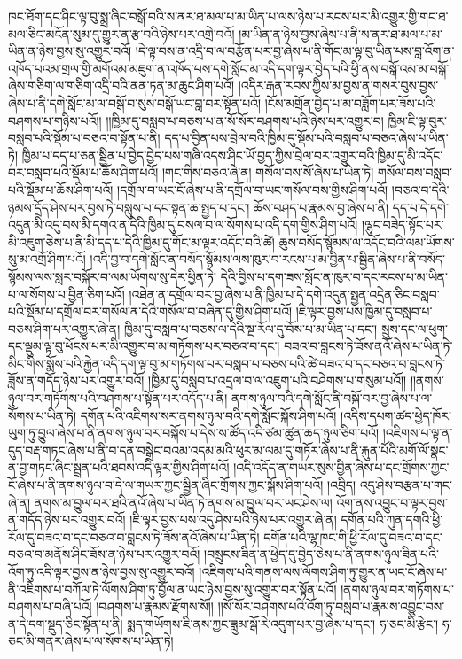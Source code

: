 ཁང་ཐོག་དང་ཤིང་ལྟ་བུ་སྨྲ་ཞིང་བསྒོ་བའི་ས་ནར་ཐ་མལ་པ་མ་ཡིན་པ་ལས་ཉེས་པ་རངས་པར་མི་འགྱུར་གྱི་གང་ཐ་མལ་ཅིང་མངོན་སུམ་དུ་གྱུར་ན་རྩ་བའི་ཉེས་པར་འགྲེ་བའོ། །མ་ཡིན་ན་ཉེས་བྱས་ཞེས་པ་ནི་ས་ནར་ཐ་མལ་པ་མ་ཡིན་ན་ཉེས་བྱས་སུ་འགྱུར་བའོ། །དེ་ལྟ་བས་ན་འདྲི་བ་ལ་བརྩོན་པར་བྱ་ཞེས་པ་ནི་གོང་མ་ལྟ་བུ་ཡིན་པས་བླ་འོག་ན་འཁོད་པའམ་གྲལ་གྱི་མགོའམ་མཇུག་ན་འཁོད་པས་དགེ་སློང་མ་འདི་དག་ལྟར་བྱེད་པའི་ཕྱི་ནས་བསྒོ་འམ་མ་བསྒོ་ཞེས་གཅིག་ལ་གཅིག་འདྲི་བའི་ནན་ཏན་མ་ཆུང་ཤིག་པའོ། །འདིར་རྒན་རབས་ཀྱིས་མ་བྱས་ན་གསར་བུས་བྱས་ཞེས་པ་ནི་དགེ་སློང་མ་ལ་བསྒོ་བ་སུས་བསྒོ་ཡང་བླ་བར་སྟོན་པའོ། །ངོས་མགྲོན་བྱེད་པ་མ་བཟློག་པར་ཟོས་པའི་བཤགས་པ་གཉིས་པའོ།། །།ཁྱིམ་དུ་བསླབ་པ་བཅས་པ་ན་སོ་སོར་བཤགས་པའི་ཉེས་པར་འགྱུར་བ། ཁྱིམ་ཇི་ལྟ་བུར་བསླབ་པའི་སྡོམ་པ་བཅའ་བ་སྟོན་པ་ནི། དད་པ་བྱིན་པས་བྲེལ་བའི་ཁྱིམ་དུ་སྡོམ་པའི་བསླབ་པ་བཅའ་ཞེས་པ་ཡིན་ཏེ། ཁྱིམ་པ་དད་པ་ཅན་སྦྱིན་པ་བྱེད་བྱེད་པས་གཞི་འདས་ཤིང་ཡོ་བྱད་ཀྱིས་བྲེལ་བར་འགྱུར་བའི་ཁྱིམ་དུ་མི་འདོང་བར་བསླབ་པའི་སྡོམ་པ་ཆོས་ཤིག་པའོ། །གང་གིས་བཅའ་ཞེ་ན། གསོལ་བས་སོ་ཞེས་པ་ཡིན་ཏེ། གསོལ་བས་བསླབ་པའི་སྡོམ་པ་ཆོས་ཤིག་པའོ། །དགྲོལ་བ་ཡང་ངོ་ཞེས་པ་ནི་དགྲོལ་བ་ཡང་གསོལ་བས་གྱིས་ཤིག་པའོ། །བཅའ་བ་དེའི་ཉམས་དྲོད་ཤེས་པར་བྱས་ཏེ་བསླུས་པ་དང་སྟན་ཆ་སྤྱད་པ་དང་། ཆོས་བཤད་པ་རྣམས་བྱ་ཞེས་པ་ནི། དད་པ་དེ་དགེ་འདུན་མི་འདུ་བས་མི་དགའ་ན་དེའི་ཁྱིམ་དུ་བསལ་བ་ལ་སོགས་པ་འདི་དག་གྱིས་ཤིག་པའོ། །ལྷུང་བཟེད་སྟོང་པར་མི་འཇུག་ཅེས་པ་ནི་མི་དད་པ་དེའི་ཁྱིམ་དུ་གོང་མ་ལྟར་འདོང་བའི་ཚེ། ཆུས་བསོད་སྙོམས་ལ་འདོང་བའི་ལམ་ཡོགས་སུ་མ་འགྲོ་ཤིག་པའོ། །འདི་བྱ་བ་དགེ་སློང་ན་བསོད་སྙོམས་ལས་ཁུར་བ་རངས་པ་མ་བྱིན་པ་སྦྱིན་ཞེས་པ་ནི་བསོད་སྙོམས་ལས་སླར་བསྐོར་བ་ལམ་ཡོགས་སུ་དེར་ཕྱིན་ཏེ། དེའི་བྱིས་པ་དག་ཟས་སློང་ན་ཁུར་བ་དང་རངས་པ་མ་ཡིན་པ་ལ་སོགས་པ་བྱིན་ཅིག་པའོ། །འཐེན་ན་དགྲོལ་བར་བྱ་ཞེས་པ་ནི་ཁྱིམ་པ་དེ་དགེ་འདུན་སྤྱན་འདྲེན་ཅིང་བསླབ་པའི་སྡོམ་པ་དགྲོལ་བར་གསོལ་ན་དེའི་གསོལ་བ་བཞིན་དུ་གྱིས་ཤིག་པའོ། །ཇི་ལྟར་བྱས་པས་ཁྱིམ་དུ་བསླབ་པ་བཅས་ཤིག་པར་འགྱུར་ཞེ་ན། ཁྱིམ་དུ་བསླབ་པ་བཅས་ལ་དེའི་སྔ་རོལ་དུ་བོས་པ་མ་ཡིན་པ་དང་། སྲུས་དང་ལ་ཕུག་དང་ལྡུམ་ལྟ་བུ་ཕོངས་པར་མི་འགྱུར་བ་མ་གཏོགས་པར་བཅའ་བ་དང་། བཟའ་བ་བླངས་ཏེ་ཟོས་ནའོ་ཞེས་པ་ཡིན་ཏེ་མིང་གིས་སྨོས་པའི་རྐྱེན་འདི་དག་ལྟ་བུ་མ་གཏོགས་པར་བསླབ་པ་བཅས་པའི་ཚེ་བཟའ་བ་དང་བཅའ་བ་བླངས་ཏེ་ཟློས་ན་གདོད་ཉེས་པར་འགྱུར་བའོ། །ཁྱིམ་དུ་བསླབ་པ་འདྲལ་བ་ལ་འཇུག་པའི་བཤེགས་པ་གསུམ་པའོ།། །།ནགས་ཉུལ་བར་གཏོགས་པའི་བཤགས་པ་སྟོན་པར་འདོད་པ་ནི། ནགས་ཉུལ་བའི་དགེ་སློང་ནི་བསྐོ་བར་བྱ་ཞེས་པ་ལ་སོགས་པ་ཡིན་ཏེ། དགོན་པའི་འཇིགས་སར་ནགས་ཉུལ་བའི་དགེ་སློང་སྐོས་ཤིག་པའོ། །འདིས་དཔག་ཚད་ཕྱེད་ཁོར་ཡུག་ཏུ་བྱུལ་ཞེས་པ་ནི་ནགས་ཉུལ་བར་བསྐོས་པ་དེས་ས་ཚོད་འདི་ཙམ་ཚུན་ཆད་ཉུལ་ཅིག་པའོ། །འཇིགས་པ་ལྟ་ན་དུད་བརྡ་གཏང་ཞེས་པ་ནི་བ་དན་བསྒྲེང་བའམ་འདམ་མའི་ཕུར་མ་ལམ་དུ་གཏོར་ཞེས་པ་ནི་རྐུན་པོའི་མགོ་ལོ་སྣང་ན་བྱ་གཏང་ཞིང་སྦྲན་པའི་ཐབས་འདི་ལྟར་གྱིས་ཤིག་པའོ། །འདི་འདོད་ན་གཡར་སུས་བྱིན་ཞེས་པ་དང་གྲོགས་ཀྱང་ངོ་ཞེས་པ་ནི་ནགས་ཉུལ་བ་དེ་ལ་གཡར་ཀྱང་སྦྱིན་ཞིང་གྲོགས་ཀྱང་སྐོས་ཤིག་པའོ། །འབྲིད། འདུ་ཤེས་བརྩན་པ་གང་ཞེ་ན། ནགས་མ་བྱུལ་བར་ཐའི་ནའོ་ཞེས་པ་ཡིན་ཏེ་ནགས་མ་བྱུལ་བར་ཡང་ཤེས་ལ། འོག་ནས་འབྱུང་བ་ལྟར་བྱས་ན་གདོད་ཉེས་པར་འགྱུར་བའོ། །ཇི་ལྟར་བྱས་པས་འདུ་ཤེས་པའི་ཉེས་པར་འགྱུར་ཞེ་ན། དགོན་པའི་ཀུན་དགའི་ཕྱི་རོལ་དུ་བཟའ་བ་དང་བཅའ་བ་བླངས་ཏེ་ཟོས་ནའོ་ཞེས་པ་ཡིན་ཏེ། དགོན་པའི་ལྷ་ཁང་གི་ཕྱི་རོལ་དུ་བཟའ་བ་དང་བཅའ་བ་མནོས་ཤིང་ཟོས་ན་ཉེས་པར་འགྱུར་བའོ། །བསྲུངས་ཟིན་ན་ཕྱེད་དུ་བྱེད་ཅེས་པ་ནི་ནགས་ཉུལ་ཟིན་པའི་འོག་ཏུ་འདི་ལྟར་བྱས་ན་ཉེས་བྱས་སུ་འགྱུར་བའོ། །འཇིགས་པའི་གནས་ལས་ལོགས་ཤིག་ཏུ་གྱུར་ན་ཡང་ངོ་ཞེས་པ་ནི་འཇིགས་པ་བཀོལ་ཏེ་ལོགས་ཤིག་ཏུ་བྱོལ་ན་ཡང་ཉེས་བྱས་སུ་འགྱུར་བར་སྟོན་པའོ། །ནགས་ཉུལ་བར་གཏོགས་པ་བཤགས་པ་བཞི་པའོ། །བཤགས་པ་རྣམས་རྫོགས་སོ།། །།སོ་སོར་བཤགས་པའི་འོག་ཏུ་བསླབ་པ་རྣམས་འབྱུང་བས་ན་དེ་དག་སྡུད་ཅིང་སྟོན་པ་ནི། སྨད་གཡོགས་ཇི་ནས་ཀྱང་ཟླུམ་སྒོ་རེ་འདུག་པར་བྱ་ཞེས་པ་དང་། ཧ་ཅང་མི་རྩེང་། ཧ་ཅང་མི་གནར་ཞེས་པ་ལ་སོགས་པ་ཡིན་ཏེ། 